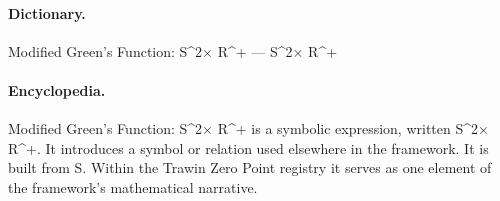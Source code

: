 \paragraph{Dictionary.}
Modified Green’s Function: S\textasciicircum{}2× R\textasciicircum{}+ — S\textasciicircum{}2× R\textasciicircum{}+

\paragraph{Encyclopedia.}
Modified Green’s Function: S\textasciicircum{}2× R\textasciicircum{}+ is a symbolic expression, written S\textasciicircum{}2× R\textasciicircum{}+. It introduces a symbol or relation used elsewhere in the framework. It is built from S. Within the Trawin Zero Point registry it serves as one element of the framework's mathematical narrative.
